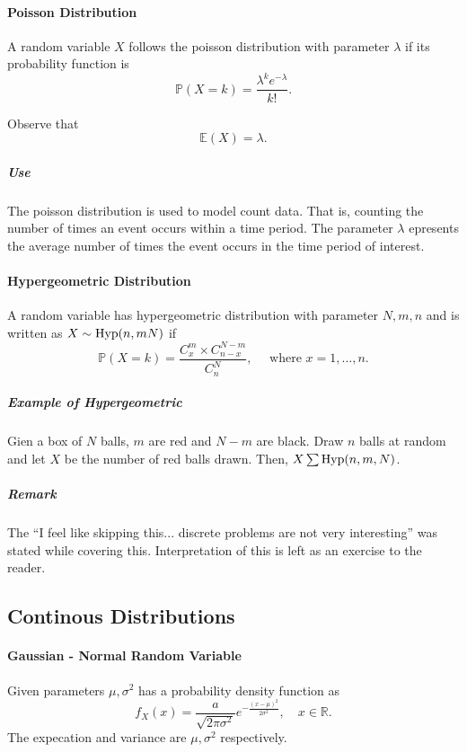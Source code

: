 \paragraph{Poisson Distribution}
A random variable \(X\) follows the poisson distribution
with parameter \(\lambda\) if its probability function is
\[
    \mathbb{P}(X = k)
    = \frac{\lambda^k e^{-\lambda}}{k!}.
\]

Observe that
\[
    \mathbb{E}(X) = \lambda.
\]

\subparagraph{Use} The poisson distribution is used to model
count data. That is, counting the number of times
an event occurs within a time period.
The parameter \(\lambda\) epresents the average number of times
the event occurs in the time period of interest.



\paragraph{Hypergeometric Distribution}
A random variable has hypergeometric distribution with
parameter \(N, m, n\) and is written as
\(X\sim \mathrm{Hyp}(n,m N)\) if
\[
    \mathbb{P}(X = k)
    =
    \frac{C_x^m \times C^{N-m}_{n-x}}{C^N_n},
    \quad
    \text{ where } x = 1,\dots, n.
\]
\subparagraph{Example of Hypergeometric}
Gien a box of \(N\) balls, \(m\) are red and
\(N - m\) are black. Draw \(n\) balls at random and let
\(X\) be the number of red balls drawn. Then, \(X\sum \mathrm{Hyp}(n, m, N)\).

\subparagraph{Remark}
The ``I feel like skipping this... discrete problems are not very interesting''
was stated while covering this. Interpretation of this
is left as an exercise to the reader.


\subsection{Continous Distributions}

\paragraph{Gaussian - Normal Random Variable}
Given parameters \(\mu, \sigma^2\) has a probability density
function as
\[
    f_X(x)
    =
    \dfrac{a}{\sqrt{2\pi\sigma^2}}
    e^{-\frac{(x-\mu)^2}{2\sigma^2}},
    \quad
    x\in \mathbb{R}.
\]
The expecation and variance are \(\mu, \sigma^2\)
respectively.
